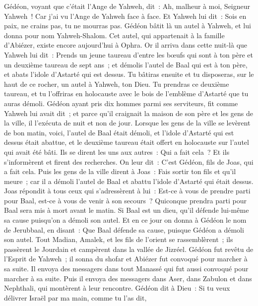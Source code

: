 \begin{multicols}{2}
Gédéon, voyant que c'était l'Ange de Yahweh, dit~: Ah, malheur à moi, Seigneur Yahweh~! Car j'ai vu l'Ange de Yahweh face à face.
Et Yahweh lui dit~: Sois en paix, ne crains pas, tu ne mourras pas.
Gédéon bâtit là un autel à Yahweh, et lui donna pour nom Yahweh-Shalom. Cet autel, qui appartenait à la famille d'Abiézer, existe encore aujourd'hui à Ophra.
Or il arriva dans cette nuit-là que Yahweh lui dit~: Prends un jeune taureau d'entre les bœufs qui sont à ton père et un deuxième taureau de sept ans~; et démolis l'autel de Baal qui est à ton père, et abats l'idole d'Astarté qui est dessus.
Tu bâtiras ensuite et tu disposeras, sur le haut de ce rocher, un autel à Yahweh, ton Dieu. Tu prendras ce deuxième taureau, et tu l'offriras en holocauste avec le bois de l'emblème d'Astarté que tu auras démoli.
Gédéon ayant pris dix hommes parmi ses serviteurs, fit comme Yahweh lui avait dit~; et parce qu'il craignait la maison de son père et les gens de la ville, il l'exécuta de nuit et non de jour.
Lorsque les gens de la ville se levèrent de bon matin, voici, l'autel de Baal était démoli, et l'idole d'Astarté qui est dessus était abattue, et le deuxième taureau était offert en holocauste sur l'autel qui avait été bâti.
Ils se dirent les uns aux autres~: Qui a fait cela~? Et ils s'informèrent et firent des recherches. On leur dit~: C'est Gédéon, fils de Joas, qui a fait cela.
Puis les gens de la ville dirent à Joas~: Fais sortir ton fils et qu'il meure~; car il a démoli l'autel de Baal et abattu l'idole d'Astarté qui était dessus.
Joas répondit à tous ceux qui s'adressèrent à lui~: Est-ce à vous de prendre parti pour Baal, est-ce à vous de venir à son secours~? Quiconque prendra parti pour Baal sera mis à mort avant le matin. Si Baal est un dieu, qu'il défende lui-même sa cause puisqu'on a démoli son autel.
Et en ce jour on donna à Gédéon le nom de Jerubbaal, en disant~: Que Baal défende sa cause, puisque Gédéon a démoli son autel.
Tout Madian, Amalek, et les fils de l'orient se rassemblèrent~; ils passèrent le Jourdain et campèrent dans la vallée de Jizréel.
Gédéon fut revêtu de l'Esprit de Yahweh~; il sonna du shofar et Abiézer fut convoqué pour marcher à sa suite.
Il envoya des messagers dans tout Manassé qui fut aussi convoqué pour marcher à sa suite. Puis il envoya des messagers dans Aser, dans Zabulon et dans Nephthali, qui montèrent à leur rencontre.
Gédéon dit à Dieu~: Si tu veux délivrer Israël par ma main, comme tu l'as dit,

\end{multicols}
